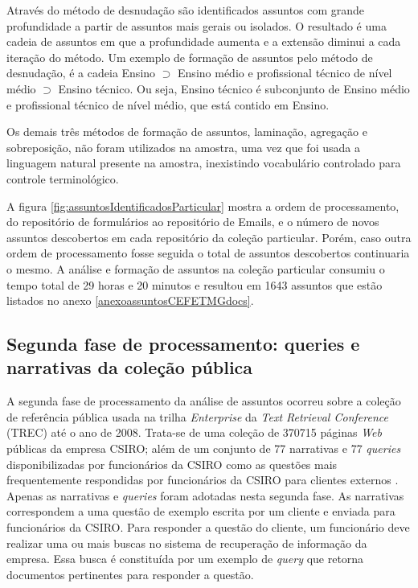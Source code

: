 Através do método de desnudação são identificados assuntos com grande profundidade a partir de assuntos mais gerais ou isolados. O resultado é uma cadeia de assuntos em que a profundidade aumenta e a extensão diminui a cada iteração do método.
Um exemplo de formação de assuntos pelo método de desnudação, é a cadeia Ensino $\supset$ Ensino médio e profissional técnico de nível médio $\supset$ Ensino técnico.
Ou seja, Ensino técnico é subconjunto de Ensino médio e profissional técnico de nível médio, que está contido em Ensino.

Os demais três métodos de formação de assuntos, laminação, agregação e sobreposição, não foram utilizados na amostra, uma vez que foi usada a linguagem natural presente na amostra, inexistindo vocabulário controlado para controle terminológico.

A figura \ref{fig:assuntosIdentificadosParticular} mostra a ordem de processamento, do repositório de formulários ao repositório de Emails, e o número de novos assuntos descobertos em cada repositório da coleção particular. Porém, caso outra ordem de processamento fosse seguida o total de assuntos descobertos continuaria o mesmo. A análise e formação de assuntos na coleção particular consumiu o tempo total de 29 horas e 20 minutos e resultou em 1643 assuntos que estão listados no anexo \ref{anexoassuntosCEFETMGdocs}. 



\subsection{Segunda fase de processamento: queries e narrativas da coleção pública}

A segunda fase de processamento da análise de assuntos ocorreu sobre a coleção de referência pública usada na trilha \textit{Enterprise} da \textit{Text Retrieval Conference} (TREC) até o ano de 2008. Trata-se de uma coleção de 370715 páginas \textit{Web} públicas da empresa CSIRO; além de um conjunto de 77 narrativas e 77 \textit{queries} disponibilizadas por funcionários da CSIRO como as questões mais frequentemente respondidas por funcionários da CSIRO para clientes externos \cite{bailey07csiro}. Apenas as narrativas e \textit{queries} foram adotadas nesta segunda fase. As narrativas correspondem a uma questão de exemplo escrita por um cliente e enviada para funcionários da CSIRO. Para responder a questão do cliente, um funcionário deve realizar uma ou mais buscas no sistema de recuperação de informação da empresa. Essa busca é constituída por um exemplo de \textit{query} que retorna documentos pertinentes para responder a questão.

